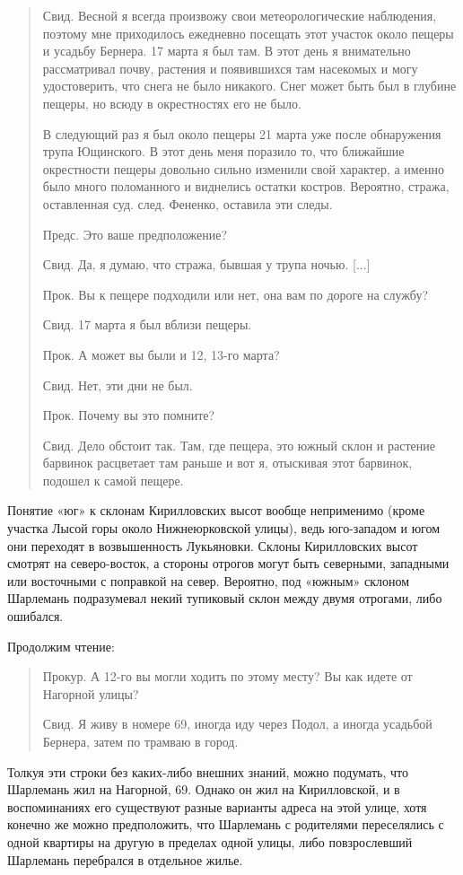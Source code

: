 \begin{quotation}
Свид. Весной я всегда произвожу свои метеорологические наблюдения, поэтому мне приходилось ежедневно посещать этот участок около пещеры и усадьбу Бернера. 17 марта я был там. В этот день я внимательно рассматривал почву, растения и появившихся там насекомых и могу удостоверить, что снега не было никакого. Снег может быть был в глубине пещеры, но всюду в окрестностях его не было.

В следующий раз я был около пещеры 21 марта уже после обнаружения трупа Ющинского. В этот день меня поразило то, что ближайшие окрестности пещеры довольно сильно изменили свой характер, а именно было много поломанного и виднелись остатки костров. Вероятно, стража, оставленная суд. след. Фененко, оставила эти следы.

Предс. Это ваше предположение?

Свид. Да, я думаю, что стража, бывшая у трупа ночью. [...]

Прок. Вы к пещере подходили или нет, она вам по дороге на службу?

Свид. 17 марта я был вблизи пещеры.

Прок. А может вы были и 12, 13-го марта?

Свид. Нет, эти дни не был. 

Прок. Почему вы это помните?

Свид. Дело обстоит так. Там, где пещера, это южный склон и растение барвинок расцветает там раньше и вот я, отыскивая этот барвинок, подошел к самой пещере.
\end{quotation}

Понятие «юг» к склонам Кирилловских высот вообще неприменимо (кроме участка Лысой горы около Нижнеюрковской улицы), ведь юго-западом и югом они переходят в возвышенность Лукьяновки. Склоны Кирилловских высот смотрят на северо-восток, а стороны отрогов могут быть северными, западными или восточными с поправкой на север. Вероятно, под «южным» склоном Шарлемань подразумевал некий тупиковый склон между двумя отрогами, либо ошибался.

Продолжим чтение:

\begin{quotation}
Прокур. А 12-го вы могли ходить по этому месту? Вы как идете от Нагорной улицы?

Свид. Я живу в номере 69, иногда иду через Подол, а иногда усадьбой Бернера, затем по трамваю в город.
\end{quotation}

Толкуя эти строки без каких-либо внешних знаний, можно подумать, что Шарлемань жил на Нагорной, 69. Однако он жил на Кирилловской, и в воспоминаниях его существуют разные варианты адреса на этой улице, хотя конечно же можно предположить, что Шарлемань с родителями переселялись с одной квартиры на другую в пределах одной улицы, либо повзрослевший Шарлемань перебрался в отдельное жилье.

